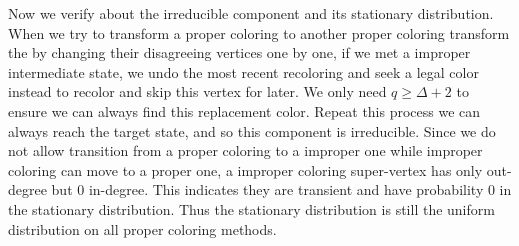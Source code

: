 \documentclass{article}
\theoremstyle{definition}
\begin{document}
	\noindent Now we verify about the irreducible component and its stationary distribution. When we try to transform a proper coloring to another proper coloring transform the by changing their disagreeing vertices one by one, if we met a improper intermediate state, we undo the most recent recoloring and seek a legal color instead to recolor and skip this vertex for later. We only need $q\geq \Delta+2$ to ensure we can always find this replacement color. Repeat this process we can always reach the target state, and so this component is irreducible. Since we do not allow transition from a proper coloring to a improper one while improper coloring can move to a proper one, a improper coloring super-vertex has only out-degree but 0 in-degree. This indicates they are transient and have probability 0 in the stationary distribution. Thus the stationary distribution is still the uniform distribution on all proper coloring methods. 
\end{document}

